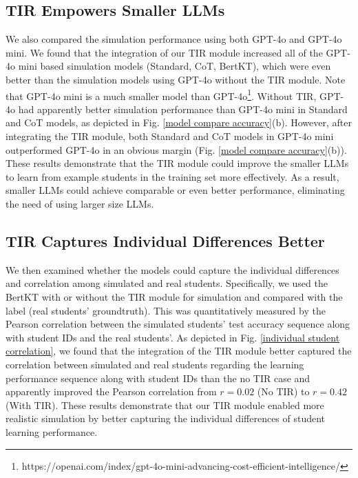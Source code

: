 \subsection{TIR Empowers Smaller LLMs}
We also compared the simulation performance using both GPT-4o and GPT-4o mini.
We found that the integration of our TIR module increased all of the GPT-4o mini based simulation models (Standard, CoT, BertKT), which were even better than the simulation models using GPT-4o without the TIR module. Note that GPT-4o mini is a much smaller model than GPT-4o\footnote{https://openai.com/index/gpt-4o-mini-advancing-cost-efficient-intelligence/}. Without TIR, GPT-4o had apparently better simulation performance than GPT-4o mini in Standard and CoT models, as depicted in Fig. \ref{model compare accuracy}(b). However, after integrating the TIR module, both Standard and CoT models in GPT-4o mini outperformed GPT-4o in an obvious margin (Fig. \ref{model compare accuracy}(b)). These results demonstrate that the TIR module could improve the smaller LLMs to learn from example students in the training set more effectively. As a result, smaller LLMs could achieve comparable or even better performance, eliminating the need of using larger size LLMs. 





\subsection{TIR Captures Individual Differences Better}
We then examined whether the models could capture the individual differences and correlation among simulated and real students. Specifically, we used the BertKT with or without the TIR module  for simulation and compared with the 
label (real students' groundtruth). 
%
This was quantitatively measured by the Pearson correlation between the simulated students' test accuracy sequence along with student IDs and the real students'.    
As depicted in Fig. \ref{individual student correlation}, we found that the integration of the TIR module better captured the correlation between simulated and real students regarding the learning performance sequence along with student IDs than the no TIR case and apparently improved the Pearson correlation from $r=0.02$ (No TIR) to $r=0.42$ (With TIR).
These results demonstrate that our TIR module enabled more realistic simulation by better capturing the individual differences of student learning performance.

